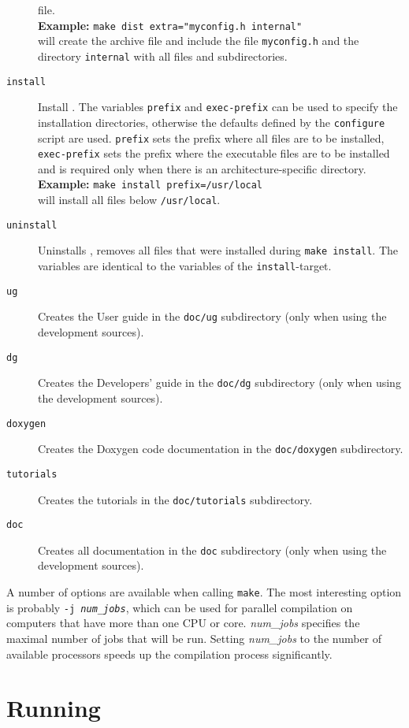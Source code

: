 \begin{description}
  file. \\
  \textbf{Example:} \verb!make dist extra="myconfig.h internal"!\\
  will create the archive file and include the file
  \texttt{myconfig.h} and the directory \texttt{internal} with all
  files and subdirectories.
\item[\texttt{install}] Install \es. The variables \texttt{prefix} and
  \texttt{exec-prefix} can be used to specify the installation
  directories, otherwise the defaults defined by the
  \texttt{configure} script are used. \texttt{prefix} sets the prefix
  where all \es files are to be installed, \texttt{exec-prefix} sets
  the prefix where the executable files are to be installed and is
  required only when there is an architecture-specific directory.\\
  \textbf{Example:} \verb!make install prefix=/usr/local!\\
  will install all files below \texttt{/usr/local}.
\item[\texttt{uninstall}] Uninstalls \es, \ie removes all files that
  were installed during \texttt{make install}. The variables are
  identical to the variables of the \texttt{install}-target.
\item[\texttt{ug\ \ }] Creates the User guide in the \texttt{doc/ug}
  subdirectory (only when using the development sources).
\item[\texttt{dg\ \ }] Creates the Developers' guide in the
  \texttt{doc/dg} subdirectory (only when using the development
  sources).
\item[\texttt{doxygen\ \ }] Creates the Doxygen code documentation in the
  \texttt{doc/doxygen} subdirectory.
\item[\texttt{tutorials\ \ }] Creates the \es tutorials in the
  \texttt{doc/tutorials} subdirectory.
\item[\texttt{doc\ }] Creates all documentation in the \texttt{doc}
  subdirectory (only when using the development sources).
\end{description}

A number of options are available when calling \texttt{make}.  The
most interesting option is probably \texttt{-j \textit{num\_jobs}},
which can be used for parallel compilation on computers that have more
than one CPU or core.  \textit{num\_jobs} specifies the maximal number
of jobs that will be run.  Setting \textit{num\_jobs} to the number of
available processors speeds up the compilation process significantly.

\section{Running \es}
\label{sec:run}

